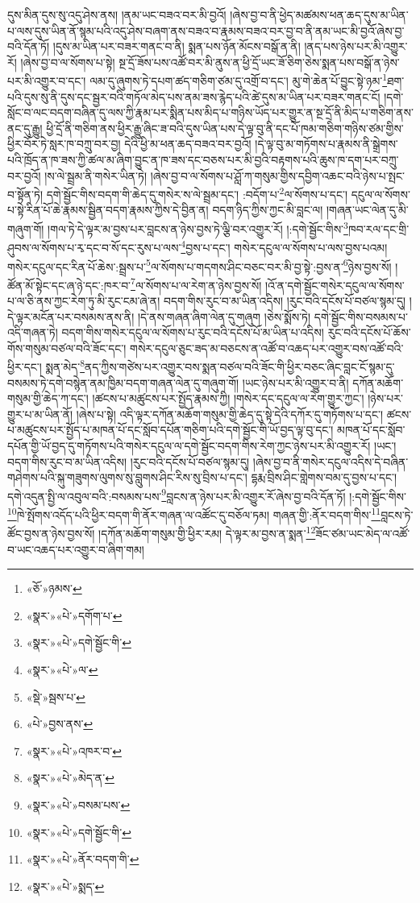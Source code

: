 དུས་མིན་དུས་སུ་འདུ་ཤེས་ནས། །ནམ་ཡང་བཟའ་བར་མི་བྱའོ། །ཞེས་བྱ་བ་ནི་ཕྱེད་མཚམས་ཕན་ཆད་དུས་མ་ཡིན་པ་ལས་དུས་ཡིན་ནོ་སྙམ་པའི་འདུ་ཤེས་བཞག་ནས་བཟའ་བ་རྣམས་བཟའ་བར་བྱ་བ་ནི་ནམ་ཡང་མི་བྱའོ་ཞེས་བྱ་བའི་དོན་ཏོ། །དུས་མ་ཡིན་པར་བཟར་གནང་བ་ནི། སྨན་པས་ཉོན་མོངས་བསྒོ་ན་ནི། །ནད་པས་ཉེས་པར་མི་འགྱུར་རོ། །ཞེས་བྱ་བ་ལ་སོགས་པ་སྟེ། སྔ་དྲོ་ཟོས་པས་འཚོ་བར་མི་ནུས་ན་ཕྱི་དྲོ་ཡང་ཟོ་ཅིག་ཅེས་སྨན་པས་བསྒོ་ན་ཉེས་པར་མི་འགྱུར་བ་དང་། ལམ་དུ་ཞུགས་ཏེ་དཔག་ཚད་གཅིག་ཙམ་དུ་འགྲོ་བ་དང་། མུ་གེ་ཆེན་པོ་བྱུང་སྟེ་ཉམ་\footnote{«ཅོ་»ཉམས་}ཐག་པའི་དུས་སུ་ནི་དུས་དང་སྦྱར་བའི་གཏོལ་མེད་པས་ནམ་ཟས་རྙེད་པའི་ཚེ་དུས་མ་ཡིན་པར་བཟར་གནང་ངོ། །དགེ་སློང་བ་ལང་བདག་བཞིན་དུ་ལས་ཀྱི་རྣམ་པར་སྨིན་པས་མིད་པ་གཉིས་ཡོད་པར་གྱུར་ན་སྔ་དྲོ་ནི་མིད་པ་གཅིག་ནས་ནང་དུ་རྒྱུ། ཕྱི་དྲོ་ནི་གཅིག་ནས་ཕྱིར་རྒྱུ་ཞིང་ཟ་བའི་དུས་ཡིན་པས་དེ་ལྟ་བུ་ནི་དང་པོ་ཁམ་གཅིག་གཉིས་ཙམ་གྱིས་ཕྱིར་བོར་ཏེ་སླར་ཁ་བཀྲུ་བར་བྱ། དེའི་ཕྱི་མ་ཕན་ཆད་བཟའ་བར་བྱའོ། །དེ་ལྟ་བུ་མ་གཏོགས་པ་རྣམས་ནི་སྒྲེགས་པའི་ཁྲོད་ན་ཁ་ཟས་ཀྱི་ཚལ་མ་ཞིག་བྱུང་ན་ཁ་ཟས་དང་བཅས་པར་མི་བྱའི་བརྟགས་པའི་ཆུས་ཁ་དག་པར་བཀྲུ་བར་བྱའོ། །ས་ལེ་སྦྲམ་ནི་གསེར་ཡིན་ཏེ། །ཞེས་བྱ་བ་ལ་སོགས་པ་ཤློ་ཀ་གསུམ་གྱིས་དབྱིག་འཆང་བའི་ཉེས་པ་སྤང་བ་སྟོན་ཏེ། དགེ་སྦྱོང་གིས་བདག་གི་ཆེད་དུ་གསེར་ས་ལེ་སྦྲམ་དང་། :བདོག་པ་\footnote{«སྣར་»«པེ་»དགོག་པ་}ལ་སོགས་པ་དང་། དངུལ་ལ་སོགས་པ་སྟེ་རིན་པོ་ཆེ་རྣམས་སྦྱིན་བདག་རྣམས་ཀྱིས་དེ་བྱིན་ན། བདག་ཉིད་ཀྱིས་ཀྱང་མི་བླང་ལ། །གཞན་ཡང་ལེན་དུ་མི་གཞུག་གོ། །གལ་ཏེ་དེ་ལྟར་མ་བྱས་པར་བླངས་ན་ཉེས་བྱས་ཏེ་ལྕི་བར་འགྱུར་རོ། །:དགེ་སྦྱོང་གིས་\footnote{«སྣར་»«པེ་»དགེ་སྦྱོང་གི་}ཁབ་རལ་དང་གྲི་ཤུབས་ལ་སོགས་པ་རྭ་དང་བ་སོ་དང་རུས་པ་ལས་\footnote{«སྣར་»«པེ་»ལ་}བྱས་པ་དང་། གསེར་དངུལ་ལ་སོགས་པ་ལས་བྱས་པའམ། གསེར་དངུལ་དང་རིན་པོ་ཆེས་:སྦྲས་པ་\footnote{«སྡེ་»སྦས་པ་}ལ་སོགས་པ་གདགས་ཤིང་བཅང་བར་མི་བྱ་སྟེ་:བྱས་ན་\footnote{«པེ་»བྱས་ནས་}ཉེས་བྱས་སོ། །ཚོན་མོ་སྟེང་དང་ཞ་ཉེ་དང་:ཁར་བ་\footnote{«སྣར་»«པེ་»འཁར་བ་}ལ་སོགས་པ་ལ་རེག་ན་ཉེས་བྱས་སོ། །འོ་ན་དགེ་སྦྱོང་གསེར་དངུལ་ལ་སོགས་པ་ལ་ཅི་ནས་ཀྱང་རེག་ཏུ་མི་རུང་ངམ་ཞེ་ན། བདག་གིས་རུང་བ་མ་ཡིན་འདིས། །རུང་བའི་དངོས་པོ་བཙལ་སྙམ་དུ། །དེ་ལྟར་མངོན་པར་བསམས་ནས་ནི། །དེ་ནས་གཞན་ཞིག་ལེན་དུ་གཞུག །ཅེས་སྨོས་ཏེ། དགེ་སྦྱོང་གིས་བསམས་པ་འདི་གཞན་ཏེ། བདག་གིས་གསེར་དངུལ་ལ་སོགས་པ་རུང་བའི་དངོས་པོ་མ་ཡིན་པ་འདིས། རུང་བའི་དངོས་པོ་ཆོས་གོས་གསུམ་བཙལ་བའི་ཟོང་དང་། གསེར་དངུལ་ཅུང་ཟད་མ་བཅངས་ན་འཚོ་བ་འཆད་པར་འགྱུར་བས་འཚོ་བའི་ཕྱིར་དང་། སྨན་མེད་\footnote{«སྣར་»«པེ་»མེད་ན་}ནད་ཀྱིས་གཙེས་པར་འགྱུར་བས་སྨན་བཙལ་བའི་ཟོང་གི་ཕྱིར་བཅང་ཞིང་བླང་ངོ་སྙམ་དུ་བསམས་ཏེ་དགེ་བསྙེན་ནམ་ཁྱིམ་བདག་གཞན་ལེན་དུ་གཞུག་གོ། །ཡང་ཉེས་པར་མི་འགྱུར་བ་ནི། དཀོན་མཆོག་གསུམ་གྱི་ཆེད་ཀ་དང་། །ཚངས་པ་མཚུངས་པར་སྤྱོད་རྣམས་ཀྱི། །གསེར་དང་དངུལ་ལ་རེག་གྱུར་ཀྱང་། །ཉེས་པར་གྱུར་པ་མ་ཡིན་ནོ། །ཞེས་པ་སྟེ། འདི་ལྟར་དཀོན་མཆོག་གསུམ་གྱི་ཆེད་དུ་སྟེ་དེའི་དཀོར་དུ་གཏོགས་པ་དང་། ཚངས་པ་མཚུངས་པར་སྤྱོད་པ་མཁན་པོ་དང་སློབ་དཔོན་གཅིག་པའི་དགེ་སྦྱོང་གི་ཡོ་བྱད་ལྟ་བུ་དང་། མཁན་པོ་དང་སློབ་དཔོན་གྱི་ཡོ་བྱད་དུ་གཏོགས་པའི་གསེར་དངུལ་ལ་དགེ་སྦྱོང་བདག་གིས་རེག་ཀྱང་ཉེས་པར་མི་འགྱུར་རོ། །ཡང་། བདག་གིས་རུང་བ་མ་ཡིན་འདིས། །རུང་བའི་དངོས་པོ་བཙལ་སྙམ་དུ། །ཞེས་བྱ་བ་ནི་གསེར་དངུལ་འདིས་དེ་བཞིན་གཤེགས་པའི་སྐུ་གཟུགས་ལུགས་སུ་བླུགས་ཤིང་རིས་སུ་བྲིས་པ་དང་། དྷརྨ་བྲིས་ཤིང་གླེགས་བམ་དུ་བྱས་པ་དང་། དགེ་འདུན་སྤྱི་ལ་འབུལ་བའི་:བསམས་པས་\footnote{«སྣར་»«པེ་»བསམ་པས་}བླངས་ན་ཉེས་པར་མི་འགྱུར་རོ་ཞེས་བྱ་བའི་དོན་ཏོ། །:དགེ་སྦྱོང་གིས་\footnote{«སྣར་»«པེ་»དགེ་སྦྱོང་གི་}ཁེ་སྤོགས་འདོད་པའི་ཕྱིར་བདག་གི་ནོར་གཞན་ལ་འཚོང་དུ་བཅོལ་ཏམ། གཞན་གྱི་:ནོར་བདག་གིས་\footnote{«སྣར་»«པེ་»ནོར་བདག་གི་}བླངས་ཏེ་ཚོང་བྱས་ན་ཉེས་བྱས་སོ། །དཀོན་མཆོག་གསུམ་གྱི་ཕྱིར་རམ། དེ་ལྟར་མ་བྱས་ན་སྨན་\footnote{«སྣར་»«པེ་»སྨད་}ཟོང་ཙམ་ཡང་མེད་ལ་འཚོ་བ་ཡང་འཆད་པར་འགྱུར་བ་ཞིག་གམ། 